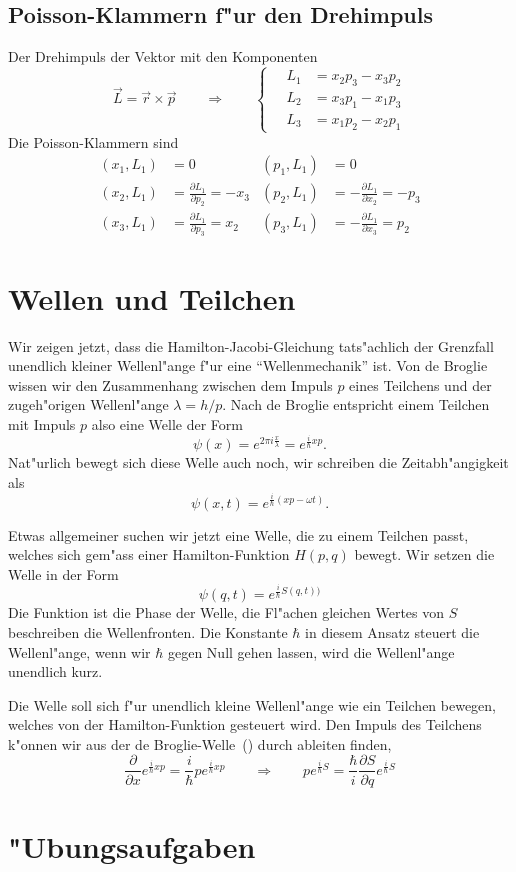 \subsection{Poisson-Klammern f"ur den Drehimpuls}
Der Drehimpuls der Vektor mit den Komponenten
\[
\vec L=\vec r\times \vec p
\qquad\Rightarrow\qquad
\left\{\quad
\begin{aligned}
L_1&=x_2p_3-x_3p_2\\
L_2&=x_3p_1-x_1p_3\\
L_3&=x_1p_2-x_2p_1
\end{aligned}
\right.
\]
Die Poisson-Klammern sind
\begin{align*}
(x_1,L_1)
&=
0
&
(p_1,L_1)
&=
0
\\
(x_2,L_1)
&=
\frac{\partial L_1}{\partial p_2}
=
-x_3
&
(p_2,L_1)
&=
-\frac{\partial L_1}{\partial x_2}
=
-p_3
\\
(x_3,L_1)
&=
\frac{\partial L_1}{\partial p_3}
=
x_2
&
(p_3,L_1)
&=
-\frac{\partial L_1}{\partial x_3}
=
p_2
\end{align*}

\section{Wellen und Teilchen}
Wir zeigen jetzt, dass die Hamilton-Jacobi-Gleichung tats"achlich der
Grenzfall unendlich kleiner Wellenl"ange f"ur eine ``Wellenmechanik'' ist.
Von de Broglie wissen wir den Zusammenhang zwischen dem Impuls $p$
eines Teilchens und der zugeh"origen Wellenl"ange  $\lambda=h/p$.
Nach de Broglie entspricht einem Teilchen mit Impuls $p$ also eine Welle
der Form
\begin{equation}
\psi(x)
=
e^{2\pi i\frac{x}{\lambda}}
=
e^{\frac{i}{\hbar}xp}.
\label{skript:debrogliewelle}
\end{equation}
Nat"urlich bewegt sich diese Welle auch noch, wir schreiben die
Zeitabh"angigkeit als
\[
\psi(x,t)
=
e^{\frac{i}{\hbar}(xp-\omega t)}.
\]


Etwas allgemeiner suchen wir jetzt eine Welle, die zu einem Teilchen
passt, welches sich gem"ass einer Hamilton-Funktion $H(p,q)$ bewegt.
Wir setzen die Welle in der Form
\[
\psi(q,t) = e^{\frac{i}{\hbar}S(q,t))}
\]
Die Funktion ist die Phase der Welle, die Fl"achen gleichen Wertes von
$S$ beschreiben die Wellenfronten.
Die Konstante $\hbar$ in diesem Ansatz steuert die Wellenl"ange, wenn
wir $\hbar$ gegen Null gehen lassen, wird die Wellenl"ange unendlich kurz.

Die Welle soll sich f"ur unendlich kleine Wellenl"ange wie ein Teilchen
bewegen, welches von der Hamilton-Funktion gesteuert wird.
Den Impuls des Teilchens k"onnen wir aus der
de Broglie-Welle~(\label{skript:debrogliewelle}) durch ableiten finden,
\[
\frac{\partial}{\partial x}
e^{\frac{i}{\hbar}xp}
=
\frac{i}{\hbar}p
e^{\frac{i}{\hbar}xp}
\qquad
\Rightarrow
\qquad
p
e^{\frac{i}{\hbar}S}
=
\frac{\hbar}{i}
\frac{\partial S}{\partial q}
e^{\frac{i}{\hbar}S}
\]


\section*{"Ubungsaufgaben}
\begin{uebungsaufgaben}
\item

\end{uebungsaufgaben}

